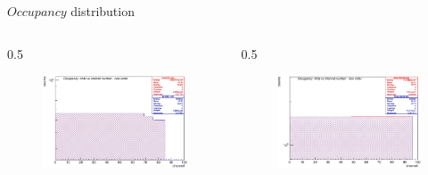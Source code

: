 \documentclass{beamer}
\begin{document}
\begin{frame}{$Occupancy$ distribution}
\vspace{-4.4mm}
\begin{columns}
    \begin{column}{0.5 \framewidth}
    \begin{figure}[H]
          \centering
          \hspace*{-2em}
        \includegraphics[width=1\columnwidth]{figures/png/Screenshot_20241013_153753.png}
          \label{fig:dfjkdsfh} 
\end{figure}    
    \end{column}
    \begin{column}{0.5 \framewidth}
           \begin{figure}[H]
          \centering
          \hspace*{-2em}
        \includegraphics[width=1\columnwidth]{figures/png/Screenshot_20241013_153707.png}
          \label{fig:dfjkdsfh} 

\end{figure}
\end{column}
\end{columns}
\end{frame}
\end{document}
